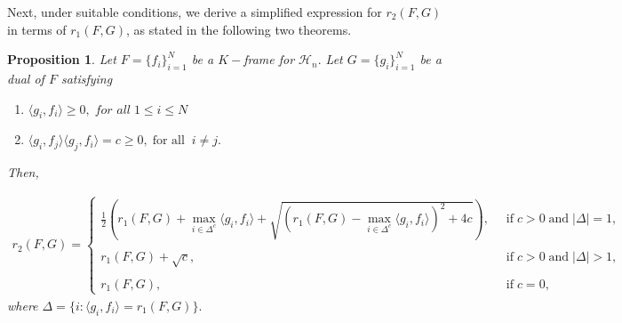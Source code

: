 \documentclass[final,1p,times]{elsarticle}
\newtheorem{prop}[thm]{Proposition}
\begin{document}
	
	
	
	
	
	
	Next, under suitable conditions, we derive a simplified expression for $r_{2}(F,G)$ in terms of $r_{1}(F,G)$, as stated in the following two theorems.

	
\begin{prop} \label{thm3point2}
		Let $F= \{f_i\}_{i=1}^N$ be a $K-$frame for $\mathcal{H}_n.$  Let $G= \{g_i\}_{i=1}^N$ be a dual of $F$ satisfying
		\begin{enumerate}
			\item [{\em (i)}] $\langle g_i , f_i \rangle \geq 0,  \; \textit{for all}\; 1\leq i \leq N$
			\item [{\em (ii)}] $ \langle g_i , f_j \rangle \langle g_j , f_i \rangle  = c \geq 0 , \; \text{for all}\;\; i \neq j.$
		\end{enumerate}
		Then,
		
		\begin{eqnarray*}
			r_{2} (F,G) = \begin{cases}\frac{1}{2} \left( r_{1} (F,G) + \max\limits_{i \in \Delta^c } \langle g_i , f_i \rangle + \sqrt{\left( r_{1} (F,G)  - \max\limits_{i \in \Delta^c } \langle g_i , f_i \rangle \right)^2 + 4c} \right),\;\; & \text{if}\; c>0 \;\text{and}\; |\Delta|=1,\\~\\
				r_{1} (F,G) + \sqrt{c}, \;\;& \text{if}\; c>0 \;\text{and}\; |\Delta|>1,\\~\\
				r_{1} (F,G),  \;\;& \text{if}\; c=0,
				
			\end{cases}
		\end{eqnarray*}
		where $\Delta =  \bigg\{ i: \langle g_i , f_i \rangle  = r_{1} (F,G)\bigg\}. $
		
		
		
		
	\end{prop}
	
\end{document}
